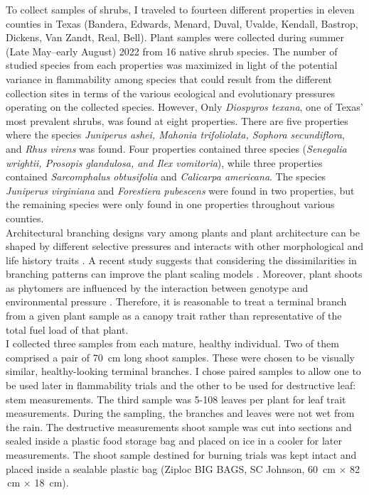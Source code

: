\documentclass[12pt]{report}
\begin{document}
To collect samples of shrubs, I traveled to fourteen different properties in eleven counties in Texas (Bandera, Edwards, Menard, Duval, Uvalde, Kendall, Bastrop, Dickens, Van Zandt, Real, Bell). Plant samples were collected during summer (Late May–early August) 2022 from 16 native shrub species. The number of studied species from each properties was maximized in light of the potential variance in flammability among species that could result from the different collection sites in terms of the various ecological and evolutionary pressures operating on the collected species. However, Only \emph{Diospyros texana}, one of Texas' most prevalent shrubs, was found at eight properties. There are five properties where the species \emph{Juniperus ashei, Mahonia trifoliolata, Sophora secundiflora}, and \emph{Rhus virens} was found. Four properties contained three species (\emph{Senegalia wrightii, Prosopis glandulosa, and Ilex vomitoria}), while three properties contained \emph{Sarcomphalus obtusifolia} \citep{hauenschild2016phylogenetic} and \emph{Calicarpa americana}. The species \emph{Juniperus virginiana} and \emph{Forestiera pubescens} were found in two properties, but the remaining species were only found in one properties throughout various counties.\\


Architectural branching designs vary among plants \citep{halle2012tropical} and plant architecture can be shaped by different selective pressures \citep{danell1994browseeffects, schwilk2003flammability} and interacts with other morphological and life history traits \citep{ackerly1998leaf, schwilk2001flammability,archibald2003growing}. A recent study suggests that considering the dissimilarities in branching patterns can improve the plant scaling models \citep{bentley2013empirical}. Moreover, plant shoots as phytomers are influenced by the interaction between genotype and environmental pressure \citep{mcsteen2005shoot, wang2008molecular}. Therefore, it is reasonable to treat a terminal branch from a given plant sample as a canopy trait rather than representative of the total fuel load of that plant.\\

I collected three samples from each mature, healthy individual. Two of them comprised a pair of 70 \,cm long shoot samples. These were chosen to be visually similar, healthy-looking terminal branches. I chose paired samples to allow one to be used later in flammability trials and the other to be used for destructive leaf: stem measurements. The third sample was 5-108 leaves per plant for leaf trait measurements. During the sampling, the branches and leaves were not wet from the rain.  The destructive measurements shoot sample was cut into sections and sealed inside a plastic food storage bag and placed on ice in a cooler for later measurements. The shoot sample destined for burning trials was kept intact and placed inside a sealable plastic bag (Ziploc BIG BAGS, SC Johnson, 60 \,cm × 82 \,cm × 18 \,cm).\\
\end{document}
